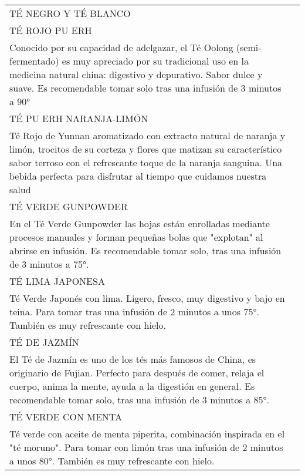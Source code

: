 \documentclass[12pt]{article}
\makeatletter
\newcommand*\ColText[1]{\textcolor{Goldenrod3}{#1}}
\newenvironment{Group}[1]
{\noindent\begin{tabular*}{\textwidth}{@{}p{1\linewidth}@{\extracolsep{\fill}}r@{}}
{\fontsize{24}{29}\selectfont\ColText{#1}}
              \\[0.8em]}
              {
\end{tabular*}}
\newcommand*\Entry[1]{%
    \sffamily#1}
\newcommand*\Expl[1]{%
    \hspace*{1em}\footnotesize #1}
\makeatother
\begin{document}
\begin{Group}{TÉ NEGRO Y TÉ BLANCO}
        \Entry{TÉ ROJO PU ERH} \\
        \Expl{Conocido por su capacidad de adelgazar, el Té Oolong (semi-fermentado) es muy apreciado por su tradicional uso en la medicina natural china: digestivo y depurativo. Sabor dulce y suave. Es recomendable tomar solo tras una infusión de 3 minutos a 90°} \\
        \Entry{TÉ PU ERH NARANJA-LIMÓN} \\
        \Expl{Té Rojo de Yunnan aromatizado con extracto natural de naranja y limón, trocitos de su corteza y flores que matizan su característico sabor terroso con el refrescante toque de la naranja sanguina. Una bebida perfecta para disfrutar al tiempo que cuidamos nuestra salud} \\
        \Entry{TÉ VERDE GUNPOWDER} \\
        \Expl{En el Té Verde Gunpowder las hojas están enrolladas mediante procesos manuales y forman pequeñas bolas que "explotan" al abrirse en infusión. Es recomendable tomar solo, tras una infusión de 3 minutos a 75°.} \\
        \Entry{TÉ LIMA JAPONESA} \\
        \Expl{Té Verde Japonés con lima. Ligero, fresco, muy digestivo y bajo en teina. Para tomar tras una infusión de 2 minutos a unos 75°. También es muy refrescante con hielo.} \\
        \Entry{TÉ DE JAZMÍN} \\
        \Expl{El Té de Jazmín es uno de los tés más famosos de China, es originario de Fujian. Perfecto para después de comer, relaja el cuerpo, anima la mente, ayuda a la digestión en general. Es recomendable tomar solo, tras una infusión de 3 minutos a 85°.} \\
        \Entry{TÉ VERDE CON MENTA} \\
        \Expl{Té verde con aceite de menta piperita, combinación inspirada en el "té moruno". Para tomar con limón tras una infusión de 2 minutos a unos 80°. También es muy refrescante con hielo.} \\
    \end{Group}
\end{document}
